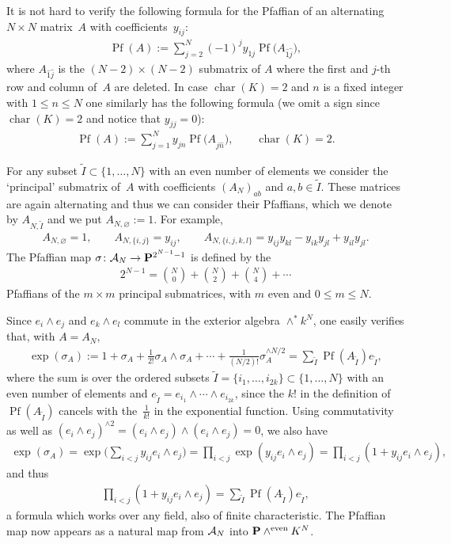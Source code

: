 \documentclass[pdftex]{sigma}
\newcommand{\PP}{{\bf P}}
\newcommand{\cA}{{\cal A}}
\newcommand{\tI}{{\tilde{I}}}
\numberwithin{equation}{section}
\begin{document}
It is not hard to verify the following formula for the Pfaffian of an alternating $N\times N$ mat\-rix~$A$ with coefficients~$y_{ij}$:
\begin{gather*}
\operatorname{Pf}(A) := \sum_{j=2}^N (-1)^jy_{1j}\operatorname{Pf}\big(A_{\hat{1}\hat{j}}\big),
\end{gather*}
where $A_{\hat{1}\hat{j}}$ is the $(N-2)\times(N-2)$ submatrix of $A$ where the first and $j$-th row and column of~$A$ are deleted. In case $\operatorname{char}(K)=2$ and $n$ is a fixed integer with $1\leq n\leq N$ one similarly has the following formula (we omit a sign since $\operatorname{char}(K)=2$ and notice that $y_{jj}=0$):
\begin{gather*}
\operatorname{Pf}(A) := \sum_{j=1}^N y_{jn}\operatorname{Pf}\big(A_{\hat{j}\hat{n}}\big),\qquad \operatorname{char}(K)=2.
\end{gather*}

For any subset $\tI\subset \{1,\ldots,N\}$ with an even number of elements we consider the `principal' submatrix of~$A$ with coefficients $(A_N)_{ab}$ and $a,b\in \tI$. These matrices are again alternating and thus we can consider their Pfaffians, which we denote by $A_{N,\tI}$ and we put $A_{N,\varnothing}:=1$. For example,
\begin{gather*}
A_{N,\varnothing}=1,\qquad A_{N,\{i,j\}}=y_{ij},\qquad A_{N,\{i,j,k,l\}}=y_{ij}y_{kl} - y_{ik}y_{jl} + y_{il}y_{jl}.
\end{gather*}
The Pfaffian map $\sigma\colon \cA_N\rightarrow \PP^{2^{N-1}-1}$ is defined by the
\begin{gather*}
2^{N-1} = \binom{N}{0} + \binom{N}{2} + \binom{N}{4} + \cdots
\end{gather*}
Pfaffians of the $m\times m$ principal submatrices, with $m$ even and $0\leq m\leq N$.

Since $e_i\wedge e_j$ and $e_k\wedge e_l$ commute in the exterior algebra $\wedge^*k^N$, one easily verifies that, with $A=A_N$,
\begin{gather*}
\exp(\sigma_A) := 1+\sigma_A+ \frac{1}{2!} \sigma_A\wedge \sigma_A+ \cdots + \frac{1}{(N/2)!}\sigma_A^{\wedge N/2} = \sum_\tI \operatorname{Pf}(A_\tI)e_\tI,
\end{gather*}
where the sum is over the ordered subsets $\tI=\{i_1,\ldots,i_{2k}\}\subset\{1,\ldots,N\}$ with an even number of elements and $e_\tI=e_{i_1}\wedge\cdots\wedge e_{i_{2k}}$,
since the $k!$ in the definition of $\operatorname{Pf}(A_\tI)$ cancels with the~$\frac{1}{k!}$ in the exponential function. Using commutativity as well as $(e_i\wedge e_j)^{\wedge 2} =(e_i\wedge e_j)\wedge(e_i\wedge e_j)=0$, we also have
\begin{gather*}
\exp(\sigma_A) = \exp\bigg(\sum_{i<j} y_{ij}e_i\wedge e_j\bigg) = \prod_{i<j}\exp(y_{ij}e_i\wedge e_j) =\prod_{i<j}(1+y_{ij}e_i\wedge e_j),
\end{gather*}
and thus
\begin{gather*}
\prod_{i<j}(1+y_{ij}e_i\wedge e_j) = \sum_\tI \operatorname{Pf}(A_\tI)e_\tI,
\end{gather*}
a formula which works over any field, also of finite characteristic. The Pfaffian map now appears as a natural map from $\cA_N$ into $\PP \wedge^{{\rm even}}K^N$.
\end{document}
